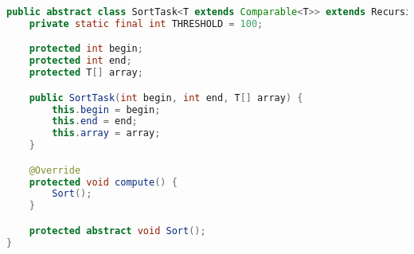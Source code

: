 \documentclass{article}
\begin{document}
\begin{lstlisting}[language=java, caption={SortTask}]
public abstract class SortTask<T extends Comparable<T>> extends RecursiveAction {
    private static final int THRESHOLD = 100;

    protected int begin;
    protected int end;
    protected T[] array;

    public SortTask(int begin, int end, T[] array) {
        this.begin = begin;
        this.end = end;
        this.array = array;
    }

    @Override
    protected void compute() {
        Sort();
    }

    protected abstract void Sort();
}
\end{lstlisting}
\end{document}
